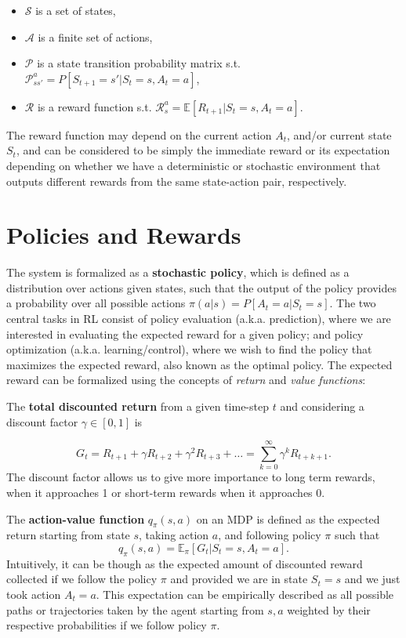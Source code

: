   \begin{itemize}
  \item $\mathcal{S}$ is a set of states,
  \item $\mathcal{A}$ is a finite set of actions,
  \item $\mathcal{P}$ is a state transition probability matrix s.t. $\mathcal{P}_{ss'}^{a} = P[S_{t+1} = s' | S_t = s, A_t = a]$, 
  \item $\mathcal{R}$ is a reward function  s.t. $\mathcal{R}_s^a = \mathbb{E}[R_{t+1}| S_t = s, A_t = a]$. 
  \end{itemize}
The reward function may depend on the current action $A_t$, and/or current state $S_t$, and can be considered to be simply the immediate reward or its expectation depending on whether we have a deterministic or stochastic environment that outputs different rewards from the same state-action pair, respectively. 

\section{Policies and Rewards}

The system is formalized as a \textbf{stochastic policy}, which is defined as a
distribution over actions given states, such that the output of the policy provides a probability over all possible actions $\pi(a|s) = P[A_t = a| S_t = s]$.
The two central tasks in RL consist of policy evaluation (a.k.a. prediction),
 where we are interested in evaluating the expected reward for a given policy; and policy
optimization (a.k.a. learning/control), where we wish to find the policy that maximizes the expected reward, also known as the optimal policy. The expected reward can be formalized using the
concepts of \emph{return} and \emph{value functions}: 


\noindent The \textbf{total discounted return} from a given time-step $t$ and considering a discount factor $\gamma \in [0,1]$ is

\begin{equation}
    G_t = R_{t+1} + \gamma R_{t+2} + \gamma^2 R_{t+3} + \ldots = \sum_{k=0}^{\infty}\gamma^k R_{t+k+1}.
\end{equation}
The discount factor allows us to give more importance to long term rewards, when it approaches 1 or short-term rewards when it approaches 0. 


The \textbf{action-value function} $q_{\pi}(s,a)$ on an MDP is defined as the expected return starting from state $s$, taking action $a$, and following policy $\pi$ such that
\begin{equation}
   q_{\pi}(s,a) = \mathbb{E}_{\pi}[G_t | S_t = s, A_t = a].
\end{equation}
Intuitively, it can be though as the expected amount of discounted reward collected if we follow the policy $\pi$ and provided we are in state $S_t=s$ and we just took action $A_t=a$. This expectation can be empirically described as all possible paths or trajectories taken by the agent starting from $s,a$ weighted by their respective probabilities if we follow policy $\pi$.


